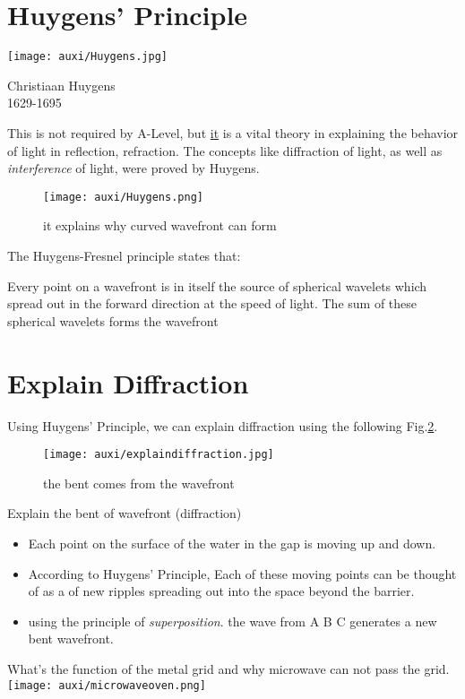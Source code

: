 \documentclass[a4paper]{tufte-handout}
\newenvironment{TaskBox} %
{\begin{tcolorbox}[breakable,colback=b1!30,colframe=b1,title=Task]} {\end{tcolorbox}}
\newenvironment{SummBox}
{\begin{tcolorbox}[breakable,colback=r1!30,colframe=r1,title=Summary]} {\end{tcolorbox}}
\begin{document}
\section{Huygens' Principle}
\begin{marginfigure}
\texttt{[image: auxi/Huygens.jpg]}
\caption{Christiaan Huygens\\1629-1695} %
\end{marginfigure}

This is not required by A-Level, but \href{https://byjus.com/physics/the-huygens-principle-and-the-principle-of-a-wave-front/#defining-the-huygens-principle}{it} is a vital theory in explaining the behavior of light in reflection, refraction. The concepts like diffraction of light, as well as \emph{interference} of light, were proved by Huygens.
\begin{figure}[h]
\centering
\texttt{[image: auxi/Huygens.png]}
\caption{it explains why curved wavefront can form}
\label{fig:huygens}
\end{figure}
The Huygens-Fresnel principle states that:
\begin{SummBox}
Every point on a wavefront is in itself the source of spherical wavelets which spread out in the forward direction at the speed of light. The sum of these spherical wavelets forms the wavefront
\end{SummBox}

\section{Explain Diffraction}
Using Huygens' Principle, we can explain diffraction using the following Fig.\ref{fig:explain diffraction}.
\begin{figure}[h]
\centering
\texttt{[image: auxi/explaindiffraction.jpg]}
\caption{the bent comes from the wavefront}
\label{fig:explain diffraction}
\end{figure}

\begin{SummBox}
Explain the bent of wavefront (diffraction)
\tcblower
\begin{itemize}
  \item Each point on the surface of the water in the gap is moving up and down.
  \item According to Huygens' Principle, Each of these moving points can be thought of as a \uline{\phantom{source   }} of new ripples spreading out into the space beyond the barrier.
  \item using the principle of \emph{superposition}. the wave from A B C generates a new bent wavefront. 
\end{itemize}
\end{SummBox}

\begin{TaskBox}
What's the function of the metal grid and why microwave can not pass the grid.
\texttt{[image: auxi/microwaveoven.png]}
\vspace{6ex}
\end{TaskBox}
\end{document}
